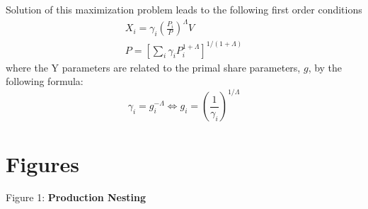 \documentclass[12pt]{article}
\begin{document}
Solution of this maximization problem leads to the following first order conditions
$$
\begin{gathered}
X_{i}=\gamma_{i}\left(\frac{P_{i}}{P}\right)^{\Lambda} V \\
P=\left[\sum_{i} \gamma_{i} P_{i}^{1+\Lambda}\right]^{1 /(1+\Lambda)}
\end{gathered}
$$
where the Y parameters are related to the primal share parameters, $g$, by the following formula:
$$
\gamma_{i}=g_{i}^{-\Lambda} \Leftrightarrow g_{i}=\left(\frac{1}{\gamma_{i}}\right)^{1 / \Lambda}
$$

\newpage
\section*{Figures}
\begin{center}

Figure 1:\textbf{ Production Nesting}


\begin{scriptsize}
\begin{tikzpicture}


\end{tikzpicture}
\end{scriptsize}
\end{center}
\end{document}
